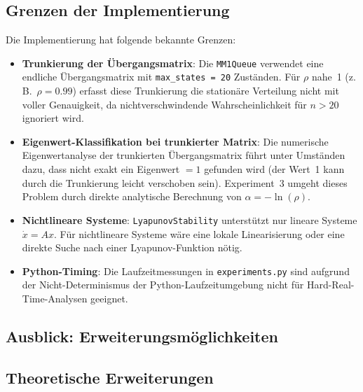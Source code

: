 ﻿\documentclass[a4paper,12pt]{report}
\theoremstyle{definition}
\begin{document}
\subsection{Grenzen der Implementierung}
\label{subsubsec:grenzen}

Die Implementierung hat folgende bekannte Grenzen:

\begin{itemize}
	\item \textbf{Trunkierung der Übergangsmatrix}: Die
	\texttt{MM1Queue} verwendet eine endliche Übergangsmatrix
	mit \texttt{max\_states = 20} Zuständen.  Für $\rho$ nahe~1
	(z.\,B.~$\rho = 0.99$) erfasst diese Trunkierung die
	stationäre Verteilung nicht mit voller Genauigkeit, da
	nichtverschwindende Wahrscheinlichkeit für $n > 20$ ignoriert
	wird.
	
	\item \textbf{Eigenwert-Klassifikation bei trunkierter Matrix}:
	Die numerische Eigenwertanalyse der trunkierten
	Übergangsmatrix führt unter Umständen dazu, dass nicht
	exakt ein Eigenwert $= 1$ gefunden wird (der Wert~1 kann
	durch die Trunkierung leicht verschoben sein).  Experiment~3
	umgeht dieses Problem durch direkte analytische Berechnung
	von $\alpha = -\ln(\rho)$.
	
	\item \textbf{Nichtlineare Systeme}: \texttt{LyapunovStability}
	unterstützt nur lineare Systeme $\dot{x} = Ax$.  Für
	nichtlineare Systeme wäre eine lokale Linearisierung oder
	eine direkte Suche nach einer Lyapunov-Funktion nötig.
	
	\item \textbf{Python-Timing}: Die Laufzeitmessungen in
	\texttt{experiments.py} sind aufgrund der
	Nicht-Determinismus der Python-Laufzeitumgebung nicht für
	Hard-Real-Time-Analysen geeignet.
\end{itemize}

\subsection{Ausblick: Erweiterungsmöglichkeiten}
\label{subsec:ausblick}

\subsection{Theoretische Erweiterungen}
\end{document}
